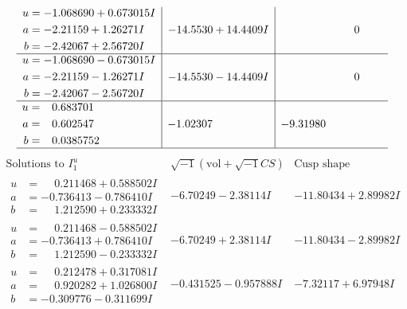 \documentclass[1p]{elsarticle_modified}
\theoremstyle{definition}
\newcommand{\I}{\sqrt{-1}}
\begin{document}
$$\begin{array}{c|c|c}
\begin{aligned}
u &= -1.068690 + 0.673015 I \\
a &= -2.21159 + 1.26271 I \\
b &= -2.42067 + 2.56720 I\end{aligned}
 & -14.5530 + 14.4409 I & \phantom{-0.000000 } 0 \\ \hline\begin{aligned}
u &= -1.068690 - 0.673015 I \\
a &= -2.21159 - 1.26271 I \\
b &= -2.42067 - 2.56720 I\end{aligned}
 & -14.5530 - 14.4409 I & \phantom{-0.000000 } 0 \\ \hline\begin{aligned}
u &= \phantom{-}0.683701\phantom{ +0.000000I} \\
a &= \phantom{-}0.602547\phantom{ +0.000000I} \\
b &= \phantom{-}0.0385752\phantom{ +0.000000I}\end{aligned}
 & -1.02307\phantom{ +0.000000I} & -9.31980\phantom{ +0.000000I}\\
 \hline 
 \end{array}$$\newpage$$\begin{array}{c|c|c}  
\text{Solutions to }I^u_{1}& \I (\text{vol} + \sqrt{-1}CS) & \text{Cusp shape}\\
 \hline 
\begin{aligned}
u &= \phantom{-}0.211468 + 0.588502 I \\
a &= -0.736413 - 0.786410 I \\
b &= \phantom{-}1.212590 + 0.233332 I\end{aligned}
 & -6.70249 - 2.38114 I & -11.80434 + 2.89982 I \\ \hline\begin{aligned}
u &= \phantom{-}0.211468 - 0.588502 I \\
a &= -0.736413 + 0.786410 I \\
b &= \phantom{-}1.212590 - 0.233332 I\end{aligned}
 & -6.70249 + 2.38114 I & -11.80434 - 2.89982 I \\ \hline\begin{aligned}
u &= \phantom{-}0.212478 + 0.317081 I \\
a &= \phantom{-}0.920282 + 1.026800 I \\
b &= -0.309776 - 0.311699 I\end{aligned}
 & -0.431525 - 0.957888 I & -7.32117 + 6.97948 I \\ \hline\begin{aligned}

\end{aligned}
\end{array}$$
\end{document}
